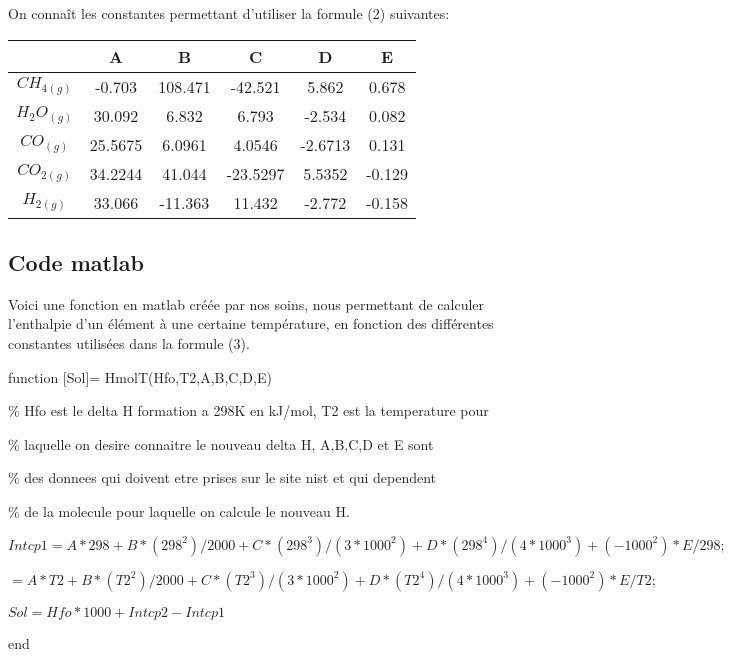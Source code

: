 \documentclass[11pt,a4paper]{report}
\begin{document}
On connaît les constantes permettant d'utiliser la formule (2) suivantes:

\begin{tabular}{|c|c|c|c|c|c|}
\hline 
\rule[-1ex]{0pt}{2.5ex}  & A & B & C & D & E \\ 
\hline 
\rule[-1ex]{0pt}{2.5ex} $CH_{4(g)}$ & -0.703 & 108.471 & -42.521 & 5.862 & 0.678 \\ 
\hline 
\rule[-1ex]{0pt}{2.5ex} $H_2O_{(g)}$ & 30.092 & 6.832 & 6.793 & -2.534 & 0.082 \\ 
\hline 
\rule[-1ex]{0pt}{2.5ex} $CO_{(g)}$ & 25.5675 & 6.0961 & 4.0546 & -2.6713 & 0.131 \\ 
\hline 
\rule[-1ex]{0pt}{2.5ex} $CO_{2(g)}$ & 34.2244 & 41.044 & -23.5297 & 5.5352 & -0.129 \\ 
\hline 
\rule[-1ex]{0pt}{2.5ex} $H_{2(g)}$ & 33.066 & -11.363 & 11.432 & -2.772 & -0.158 \\ 
\hline 
\end{tabular} 
\subsection*{Code matlab}
Voici une fonction en matlab créée par nos soins, nous permettant de calculer l'enthalpie d'un élément à une certaine température, en fonction des différentes constantes utilisées dans la formule (3).

function [Sol]= HmolT(Hfo,T2,A,B,C,D,E)

\% Hfo est le delta H formation a 298K en kJ/mol, T2 est la temperature pour

\% laquelle on desire connaitre le nouveau delta H, A,B,C,D et E sont

\% des donnees qui doivent etre prises sur le site nist et qui dependent

\% de la molecule pour laquelle on calcule le nouveau H.

$Intcp1 = A*298 + B* (298^2)/2000 + C*(298^3)/(3*1000^2) + D*(298^4)/(4*1000^3) + (-1000^2)*E/298;$

$ = A*T2 + B* (T2^2)/2000 + C*(T2^3)/(3*1000^2) + D*(T2^4)/(4*1000^3) + (-1000^2)*E/T2;$

$Sol = Hfo*1000 + Intcp2 - Intcp1$

end
\end{document}
